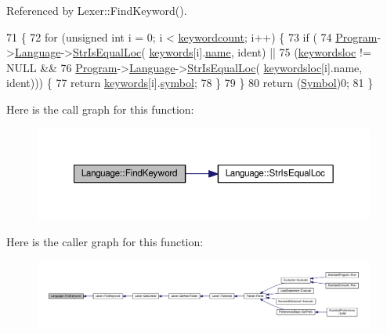 Referenced by Lexer\+::\+Find\+Keyword().


\begin{DoxyCode}
71 \{
72     \textcolor{keywordflow}{for} (\textcolor{keywordtype}{unsigned} \textcolor{keywordtype}{int} i = 0; i < \hyperlink{classLanguage_ab392fc18ba79a2a47bdde99eec400aa1}{keywordcount}; i++) \{
73         \textcolor{keywordflow}{if} (
74             \hyperlink{classProgram}{Program}->\hyperlink{classProgram_a7c82b4c429bbee984b8bb287b9e137f7}{Language}->\hyperlink{classLanguage_a68d70b8d5232b4fa0b03268531dca0a3}{StrIsEqualLoc}(
      \hyperlink{kword_8h_ae24629a120e041e6b687315832fca587}{keywords}[i].\hyperlink{structkeyworddef_a03b3d7dd316565c6fac8786186ec66c2}{name}, ident) ||
75             (\hyperlink{classLanguage_a14560ed53cf2860b61199d2882c52f67}{keywordsloc} != NULL &&
76              \hyperlink{classProgram}{Program}->\hyperlink{classProgram_a7c82b4c429bbee984b8bb287b9e137f7}{Language}->\hyperlink{classLanguage_a68d70b8d5232b4fa0b03268531dca0a3}{StrIsEqualLoc}(
      \hyperlink{classLanguage_a14560ed53cf2860b61199d2882c52f67}{keywordsloc}[i].name, ident))) \{
77             \textcolor{keywordflow}{return} \hyperlink{kword_8h_ae24629a120e041e6b687315832fca587}{keywords}[i].\hyperlink{structkeyworddef_aec6598e221bbce9e131b30989f7e2cce}{symbol};
78         \}
79     \}
80     \textcolor{keywordflow}{return} (\hyperlink{lex_8h_a7feef761cd73fac6e25b8bb80d2c4e54}{Symbol})0;
81 \}
\end{DoxyCode}


Here is the call graph for this function\+:\nopagebreak
\begin{figure}[H]
\begin{center}
\leavevmode
\includegraphics[width=350pt]{classLanguage_a8a9aa7fef5a0c2c3626249705292e71a_cgraph}
\end{center}
\end{figure}




Here is the caller graph for this function\+:\nopagebreak
\begin{figure}[H]
\begin{center}
\leavevmode
\includegraphics[width=350pt]{classLanguage_a8a9aa7fef5a0c2c3626249705292e71a_icgraph}
\end{center}
\end{figure}


